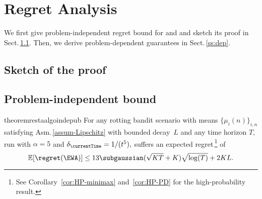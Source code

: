 \section{Regret Analysis}\label{sec:theory}

We first give problem-independent regret bound for \FEWA and \RAWUCB and sketch its proof in Sect.\,\ref{sketch}. Then, we derive problem-dependent guarantees in Sect.\,\ref{ss:dep}.


\subsection{Sketch of the proof}
\label{sketch}



\subsection{Problem-independent bound}
\begin{restatable}{theorem}{restaalgoindepub}
\label{independent_theorem}
For any rotting bandit scenario with means $\{\mu_i(n)\}_{i,n}$ satisfying Asm.\,\ref{assum-Lipschitz} with bounded decay~$L$ and any time horizon $T$, {\myAlgorithm} run with $\alpha= 5$ and $\delta_\currentTime= 1/( t^5),$ suffers an expected regret\,\footnote{See Corollary~\ref{cor:HP-minimax} and~\ref{cor:HP-PD} for the high-probability result.} of
\begin{equation*}
\mathbb{E}[\regret(\EWA)] \leq 13\subgaussian(\sqrt{KT} + K)\sqrt{\log(T)}+ 2KL.
\end{equation*}%
\end{restatable}%
